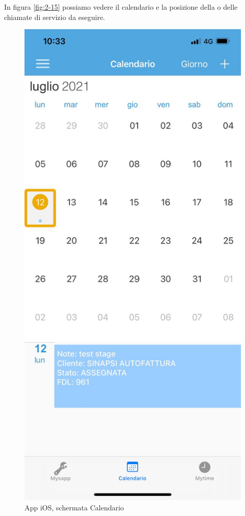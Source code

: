 In figura \ref{fig:2-15} possiamo vedere il calendario e la posizione della o delle chiamate di servizio da eseguire.\\
\begin{figure}[!h] 
	\centering 
	\includegraphics[scale = 0.13]{immagini/app iOS/calendario-iOS.jpeg} 
	\caption {App iOS, schermata Calendario}
\end{figure}
\newpage

